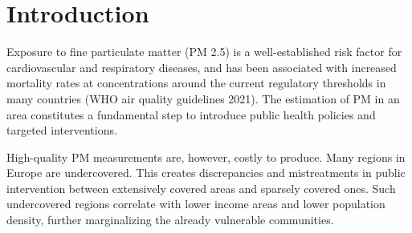 \documentclass[english, a4paper, numbers=noenddot]{article}
\begin{document}
\begin{abstract}

Despite the well-established consequences of air pollution for human health, accurately measuring its spatial distribution remains a challenge. Consequently, precise air monitoring is costly to report at scale. As a result, many regions are undercovered. This gap translates into disparities in the protection measures implemented. In this project, we offer an alternative method to estimate particulate matter (PM) 2.5 using publicly available satellite data. Both a from-scratch CNN and a ResNet50 pre-trained on BigEarthNet are deployed and compared. Additionally, we test the reliability of low-cost PM sensors and compare them to stations of the  European Environmental Agency (EEA) for reference. Finally, the best-performing model is used to create a dense continuous map of PM 2.5 in North-Eastern Germany, which we use to examine social disparities in pollution exposure across the region. 

We find that low-cost sensors are unreliable, even after calibration, and that the from-scratch model consistently achieves better results in the cross-validation arrangement. We argue that the ResNet-50 pretraining is not relevant for this specific task, and that the Sentinel-2 multispectral data modality may not be particularly relevant compared to the other modalities used.
\end{abstract}

\section{Introduction}

Exposure to fine particulate matter (PM 2.5) is a well-established risk factor for cardiovascular and respiratory diseases, and has been associated with increased mortality rates at concentrations around the current regulatory thresholds in many countries (WHO air quality guidelines 2021). The estimation of PM in an area constitutes a fundamental step to introduce public health policies and targeted interventions.

High-quality PM measurements are, however, costly to produce. Many regions in Europe are undercovered. This creates discrepancies and mistreatments in public intervention between extensively covered areas and sparsely covered ones. Such undercovered regions correlate with lower 
income areas and lower population density, further marginalizing the already vulnerable communities.
\end{document}

